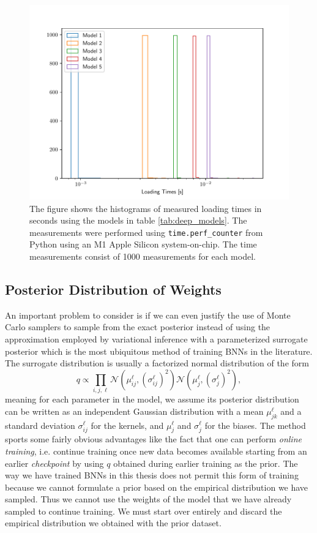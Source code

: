 \begin{figure}
    \centering
    \includegraphics[scale=1]{figures/computational_cost/loading_times.pdf}
    \caption{
        The figure shows the histograms of measured loading times in seconds using the models in table \ref{tab:deep_models}. The measurements were performed using {\tt time.perf\_counter} from Python using an M1 Apple Silicon system-on-chip. The time measurements consist of 1000 measurements for each model.
    }
    \label{fig:loading_times}
\end{figure}



\subsection{Posterior Distribution of Weights}
An important problem to consider is if we can even justify the use of Monte Carlo samplers to sample from the exact posterior instead of using the approximation employed by variational inference with a parameterized surrogate posterior which is the most ubiquitous method of training BNNs in the literature. The surrogate distribution is usually a factorized normal distribution of the form
\begin{equation}\label{eq:surrogate_dist}
    q \propto \prod_{i, j, \ell} \mathcal{N}(\mu_{ij}^\ell, (\sigma_{ij}^\ell)^2) \mathcal{N}(\mu_{j}^\ell, (\sigma_{j}^\ell)^2),
\end{equation}
meaning for each parameter in the model, we assume its posterior distribution can be written as an independent Gaussian distribution with a mean $\mu_{jk}^\ell$ and a standard deviation $\sigma_{ij}^\ell$ for the kernels, and $\mu_j^\ell$ and $\sigma_j^\ell$ for the biases. The method sports some fairly obvious advantages like the fact that one can perform \textit{online training}, i.e. continue training once new data becomes available starting from an earlier \textit{checkpoint} by using $q$ obtained during earlier training as the prior. The way we have trained BNNs in this thesis does not permit this form of training because we cannot formulate a prior based on the empirical distribution we have sampled. Thus we cannot use the weights of the model that we have already sampled to continue training. We must start over entirely and discard the empirical distribution we obtained with the prior dataset. 

